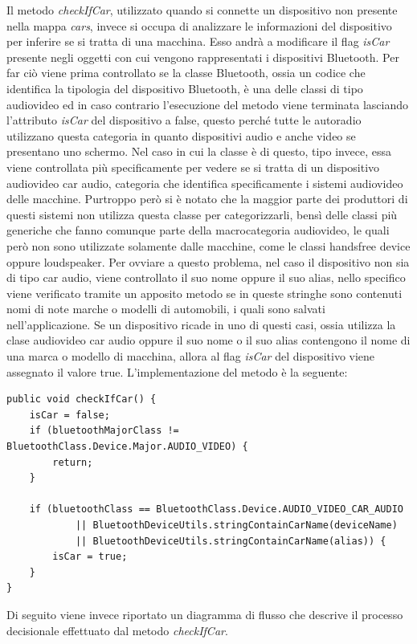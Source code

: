 Il metodo \textit{checkIfCar}, utilizzato quando si connette un dispositivo non presente nella mappa \textit{cars}, invece si occupa di analizzare le informazioni del dispositivo per inferire se si tratta di una macchina. Esso andrà a modificare il flag \textit{isCar} presente negli oggetti con cui vengono rappresentati i dispositivi Bluetooth. Per far ciò viene prima controllato se la classe Bluetooth, ossia un codice che identifica la tipologia del dispositivo Bluetooth, è una delle classi di tipo audiovideo ed in caso contrario l'esecuzione del metodo viene terminata lasciando l'attributo \textit{isCar} del dispositivo a false, questo perché tutte le autoradio utilizzano questa categoria in quanto dispositivi audio e anche video se presentano uno schermo. Nel caso in cui la classe è di questo, tipo invece, essa viene controllata più specificamente per vedere se si tratta di un dispositivo audiovideo car audio, categoria che identifica specificamente i sistemi audiovideo delle macchine. Purtroppo però si è notato che la maggior parte dei produttori di questi sistemi non utilizza questa classe per categorizzarli, bensì delle classi più generiche che fanno comunque parte della macrocategoria audiovideo, le quali però non sono utilizzate solamente dalle macchine, come le classi handsfree device oppure loudspeaker. Per ovviare a questo problema, nel caso il dispositivo non sia di tipo car audio, viene controllato il suo nome oppure il suo alias, nello specifico viene verificato tramite un apposito metodo se in queste stringhe sono contenuti nomi di note marche o modelli di automobili, i quali sono salvati nell'applicazione. Se un dispositivo ricade in uno di questi casi, ossia utilizza la clase audiovideo car audio oppure il suo nome o il suo alias contengono il nome di una marca o modello di macchina, allora al flag \textit{isCar} del dispositivo viene assegnato il valore true. L'implementazione del metodo è la seguente:
\begin{verbatim}
public void checkIfCar() {
    isCar = false;
    if (bluetoothMajorClass != BluetoothClass.Device.Major.AUDIO_VIDEO) {
        return;
    }

    if (bluetoothClass == BluetoothClass.Device.AUDIO_VIDEO_CAR_AUDIO
            || BluetoothDeviceUtils.stringContainCarName(deviceName)
            || BluetoothDeviceUtils.stringContainCarName(alias)) {
        isCar = true;
    }
}
\end{verbatim}
Di seguito viene invece riportato un diagramma di flusso che descrive il processo decisionale effettuato dal metodo \textit{checkIfCar}.

